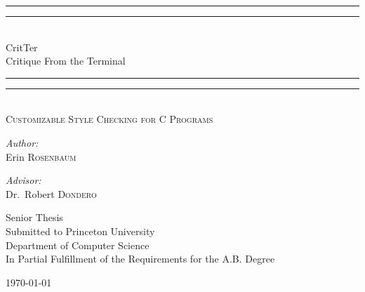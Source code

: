 \begin{titlepage}

\begin{center}

\rule{\linewidth}{1.6pt}\vspace*{-\baselineskip}\vspace*{2pt}
\rule{\linewidth}{0.4pt}\\[\baselineskip]
{\huge CritTer \\[0.5\baselineskip] Critique From the Terminal}\\[0.2\baselineskip]
\rule{\linewidth}{0.4pt}\vspace*{-\baselineskip}\vspace{3.2pt}
\rule{\linewidth}{1.6pt}\\[\baselineskip]
\scshape
\Large Customizable Style Checking for C Programs \par
\vspace*{4\baselineskip}

\begin{minipage}{0.4\textwidth}
\begin{flushleft} \large
\emph{Author:}\\
Erin \textsc{Rosenbaum}
\end{flushleft}
\end{minipage}
\begin{minipage}{0.4\textwidth}
\begin{flushright} \large
\emph{Advisor:} \\
Dr.~Robert \textsc{Dondero}
\end{flushright}
\end{minipage}

\vspace{5cm}
\small{
Senior Thesis \\[0.4cm]
Submitted to Princeton University \\
Department of Computer Science\\
In Partial Fulfillment of the Requirements for the A.B. Degree \\
}

\vfill

{\large \today}

\end{center}

\end{titlepage}
